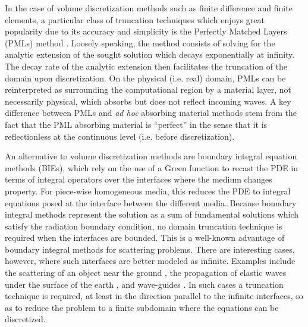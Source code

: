 \documentclass[11pt]{article}
\begin{document}
In the case of volume discretization methods such as finite difference and
finite elements, a particular class of truncation techniques which enjoys great
popularity due to its accuracy and simplicity is the Perfectly Matched Layers
(PMLs) method \cite{?}. Loosely speaking, the method consists of solving for the
analytic extension of the sought solution which decays exponentially at
infinity. The decay rate of the analytic extension then facilitates the
truncation of the domain upon discretization. On the physical (i.e. real)
domain, PMLs can be reinterpreted as surrounding the computational region by a
material layer, not necessarily physical, which absorbs but does not reflect
incoming waves. A key difference between PMLs and \emph{ad hoc} absorbing
material methods stem from the fact that the PML absorbing material is
``perfect'' in the sense that it is reflectionless at the continuous level (i.e.
before discretization).

An alternative to volume discretization methods are boundary integral equation
methods (BIEs), which rely on the use of a Green function to recast the PDE in
terms of integral operators over the interfaces where the medium changes
property. For piece-wise homogeneous media, this reduces the PDE to integral
equations posed at the interface between the different media. Because boundary
integral methods represent the solution as a sum of fundamental solutions which
satisfy the radiation boundary condition, no domain truncation technique is
required when the interfaces are bounded. This is a well-known advantage of
boundary integral methods for scattering problems. There are interesting cases,
however, where such interfaces are better modeled as infinite. Examples include
the scattering of an object near the ground \cite{}, the propagation of elastic
waves under the surface of the earth \cite{}, and wave-guides \cite{}. In such
cases a truncation technique is required, at least in the direction parallel to
the infinite interfaces, so as to reduce the problem to a finite subdomain where
the equations can be discretized.
\end{document}
